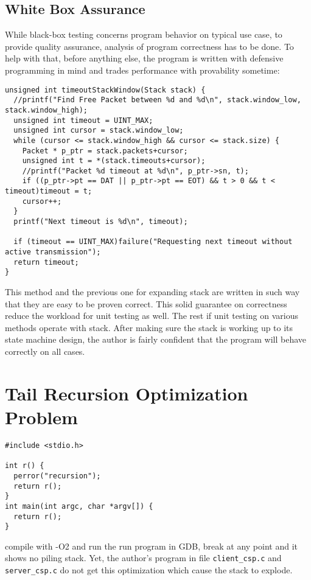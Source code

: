 \documentclass[12pt]{article}
\begin{document}
\subsection{White Box Assurance}
While black-box testing concerns program behavior on typical use case, to provide quality assurance, analysis of program correctness has to be done. To help with that, before anything else, the program is written with defensive programming in mind and trades performance with provability sometime:
\begin{samepage}
\begin{verbatim}
unsigned int timeoutStackWindow(Stack stack) {
  //printf("Find Free Packet between %d and %d\n", stack.window_low, stack.window_high);
  unsigned int timeout = UINT_MAX;
  unsigned int cursor = stack.window_low;
  while (cursor <= stack.window_high && cursor <= stack.size) {
    Packet * p_ptr = stack.packets+cursor;
    unsigned int t = *(stack.timeouts+cursor);
    //printf("Packet %d timeout at %d\n", p_ptr->sn, t);
    if ((p_ptr->pt == DAT || p_ptr->pt == EOT) && t > 0 && t < timeout)timeout = t;
    cursor++;
  }
  printf("Next timeout is %d\n", timeout);
  
  if (timeout == UINT_MAX)failure("Requesting next timeout without active transmission");
  return timeout;
}
\end{verbatim}
\end{samepage}
This method and the previous one for expanding stack are written in such way that they are easy to be proven correct. This solid guarantee on correctness reduce the workload for unit testing as well. The rest if unit testing on various methods operate with stack. After making sure the stack is working up to its state machine design, the author is fairly confident that the program will behave correctly on all cases.

\section{Tail Recursion Optimization Problem}
\begin{verbatim}
#include <stdio.h>

int r() {
  perror("recursion");
  return r();
}
int main(int argc, char *argv[]) {
  return r();
}
\end{verbatim}
compile with -O2 and run the run program in GDB, break at any point and it shows no piling stack. Yet, the author's program in file \texttt{client\_csp.c} and \texttt{server\_csp.c} do not get this optimization which cause the stack to explode.
\end{document}
